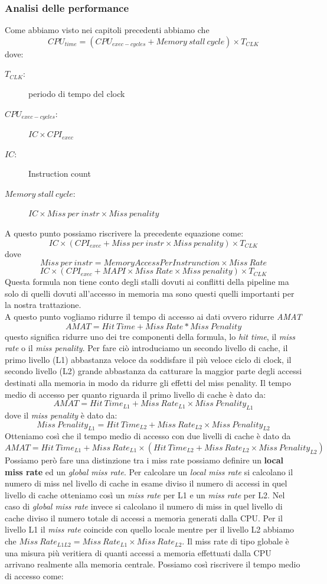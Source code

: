 \subsubsection{Analisi delle performance}\label{cachel2}
Come abbiamo visto nei capitoli precedenti abbiamo che 
$$CPU_{time} = (CPU_{exec-cycles} + Memory \ stall \ cycle) \times T_{CLK}$$
dove:
\begin{description}
\item[$T_{CLK}$:] periodo di tempo del clock
\item[$CPU_{exec-cycles}$:] $IC \times CPI_{exec}$
\item[$IC$:] Instruction count
\item[$Memory \ stall \ cycle$:] $IC \times Miss \ per \ instr \times Miss \ penality$
\end{description}
A questo punto possiamo riscrivere la precedente equazione come:
$$IC \times (CPI_{exec} + Miss \ per \ instr \times Miss \ penality) \times T_{CLK}$$
dove 
$$Miss \ per \ instr = Memory Access Per Instrunction \times Miss \ Rate$$
$$IC \times (CPI_{exec} + MAPI \times Miss \ Rate \times Miss \ penality) \times T_{CLK}$$
Questa formula non tiene conto degli stalli dovuti ai conflitti della pipeline ma solo di quelli dovuti all'accesso in memoria ma sono questi quelli importanti per la nostra trattazione.\\
A questo punto vogliamo ridurre il tempo di accesso ai dati ovvero ridurre \emph{AMAT}
$$AMAT = Hit \ Time + Miss \ Rate * Miss \ Penality$$
questo significa ridurre uno dei tre componenti della formula, lo \emph{hit time}, il \emph{miss rate} o il \emph{miss penality}. Per fare ciò introduciamo un secondo livello di cache, il primo livello (L1) abbastanza veloce da soddisfare il più veloce ciclo di clock, il secondo livello (L2) grande abbastanza da catturare la maggior parte degli accessi destinati alla memoria in modo da ridurre gli effetti del miss penality. Il tempo medio di accesso per quanto riguarda il primo livello di cache è dato da:
$$AMAT = Hit \ Time_{L1} + Miss \ Rate_{L1} \times Miss \ Penality_{L1}$$
dove il \emph{miss penality} è dato da:
$$Miss \ Penality_{L1} = Hit \ Time_{L2} + Miss \ Rate_{L2} \times Miss \ Penality_{L2}$$
Otteniamo così che il tempo medio di accesso con due livelli di cache è dato da 
$$AMAT = Hit \ Time_{L1} + Miss \ Rate_{L1} \times (Hit \ Time_{L2} + Miss \ Rate_{L2} \times Miss \ Penality_{L2})$$
Possiamo però fare una distinzione tra i miss rate possiamo definire un \textbf{local miss rate} ed un \emph{global miss rate}.
Per calcolare un \emph{local miss rate} si calcolano il numero di miss nel livello di cache in esame diviso il numero di accessi in quel livello di cache otteniamo così un \emph{miss rate} per L1 e un \emph{miss rate} per L2. Nel caso di \emph{global miss rate} invece si calcolano il numero di miss in quel livello di cache diviso il numero totale di accessi a memoria generati dalla CPU. Per il livello L1 il \emph{miss rate} coincide con quello locale mentre per il livello L2 abbiamo che $Miss \ Rate_{L1L2} = Miss \ Rate_{L1} \times Miss \ Rate_{L2}$. Il miss rate di tipo globale è una misura più veritiera di quanti accessi a memoria effettuati dalla CPU arrivano realmente alla memoria centrale. Possiamo così riscrivere il tempo medio di accesso come:
